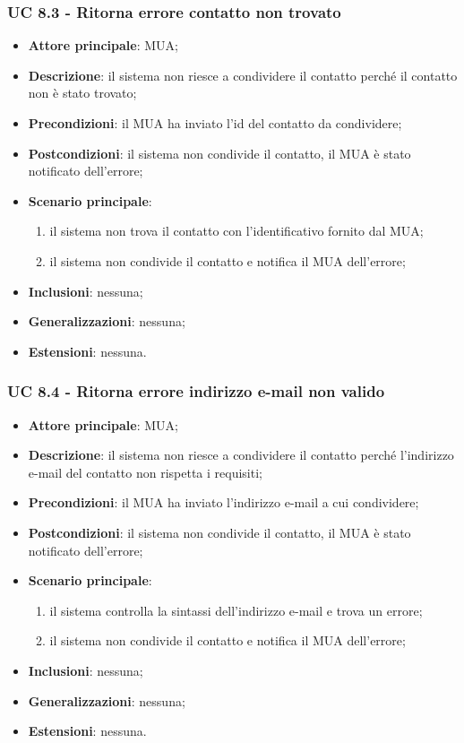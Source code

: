 \subsubsection{UC 8.3 - Ritorna errore contatto non trovato} \label{sec:UC8.3}
    \begin{itemize}
        \item \textbf{Attore principale}: MUA;
        \item \textbf{Descrizione}: il sistema non riesce a condividere il contatto perché il contatto non è stato trovato;
        \item \textbf{Precondizioni}: il MUA ha inviato l'id del contatto da condividere;
        \item \textbf{Postcondizioni}: il sistema non condivide il contatto, il MUA è stato notificato dell'errore;
        \item \textbf{Scenario principale}:
            \begin{enumerate}
                \item il sistema non trova il contatto con l'identificativo fornito dal MUA;
                \item il sistema non condivide il contatto e notifica il MUA dell'errore;
            \end{enumerate}
        \item \textbf{Inclusioni}: nessuna;
        \item \textbf{Generalizzazioni}: nessuna;
        \item \textbf{Estensioni}: nessuna.
    \end{itemize}

\subsubsection{UC 8.4 - Ritorna errore indirizzo e-mail non valido} \label{sec:UC8.4}
    \begin{itemize}
        \item \textbf{Attore principale}: MUA;
        \item \textbf{Descrizione}: il sistema non riesce a condividere il contatto perché l'indirizzo e-mail del contatto non rispetta i requisiti;
        \item \textbf{Precondizioni}: il MUA ha inviato l'indirizzo e-mail a cui condividere;
        \item \textbf{Postcondizioni}: il sistema non condivide il contatto, il MUA è stato notificato dell'errore;
        \item \textbf{Scenario principale}:
            \begin{enumerate}
                \item il sistema controlla la sintassi dell'indirizzo e-mail e trova un errore;
                \item il sistema non condivide il contatto e notifica il MUA dell'errore;
            \end{enumerate}
        \item \textbf{Inclusioni}: nessuna;
        \item \textbf{Generalizzazioni}: nessuna;
        \item \textbf{Estensioni}: nessuna.
    \end{itemize}
